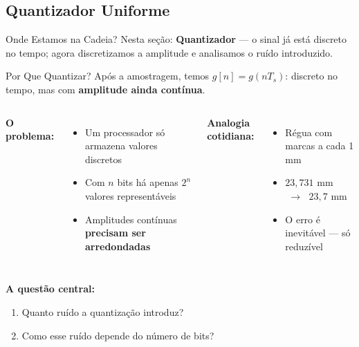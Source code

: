 
\subsection{Quantizador Uniforme}

\begin{frame}{Onde Estamos na Cadeia?}
  \vspace{0.1cm}
  {\small Nesta seção: \textbf{Quantizador} — o sinal já está discreto no
  tempo; agora discretizamos a amplitude e analisamos o ruído introduzido.}
\end{frame}

\begin{frame}{Por Que Quantizar?}
  Após a amostragem, temos $g[n] = g(nT_s)$:
  discreto no tempo, mas com \textbf{amplitude ainda contínua}.

  \vspace{0.15cm}
  \begin{columns}[T]
    \textbf{O problema:}
    \begin{itemize}
      \item Um processador só armazena valores \alert{discretos}
      \item Com $n$ bits há apenas $2^n$ valores representáveis
      \item Amplitudes contínuas \textbf{precisam ser arredondadas}
    \end{itemize}

    \textbf{Analogia cotidiana:}
    \begin{itemize}
      \item Régua com marcas a cada 1 mm
      \item $23{,}731$ mm $\;\to\;$ $23{,}7$ mm
      \item O erro é inevitável — só reduzível
    \end{itemize}
  \end{columns}

  \vspace{0.15cm}
  \textbf{A questão central:}
  \begin{enumerate}
    \item Quanto ruído a quantização introduz?
    \item Como esse ruído depende do número de bits?
  \end{enumerate}
\end{frame}

